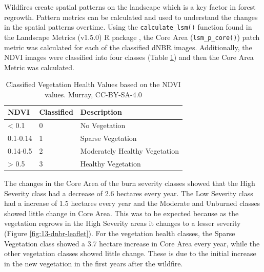 \documentclass[
]{book}
\begin{document}
Wildfires create spatial patterns on the landscape which is a key factor in forest regrowth. Pattern metrics can be calculated and used to understand the changes in the spatial patterns overtime. Using the \texttt{calculate\_lsm()} function found in the Landscape Metrics (v1.5.0) R package \citep{hesselbarth_landscapemetrics_2019}, the Core Area (\texttt{lsm\_p\_core()}) patch metric was calculated for each of the classified dNBR images. Additionally, the NDVI images were classified into four classes (Table \ref{tab:13-murray-case-study-table-2}) and then the Core Area Metric was calculated.

\begin{table}

\caption{\label{tab:13-murray-case-study-table-2}Classified Vegetation Health Values based on the NDVI values. Murray, CC-BY-SA-4.0}
\centering
\begin{tabular}[t]{l|l|l}
\hline
NDVI & Classified & Description\\
\hline
< 0.1 & 0 & No Vegetation\\
\hline
0.1-0.14 & 1 & Sparse Vegetation\\
\hline
0.14-0.5 & 2 & Moderately Healthy Vegetation\\
\hline
> 0.5 & 3 & Healthy Vegetation\\
\hline
\end{tabular}
\end{table}

The changes in the Core Area of the burn severity classes showed that the High Severity class had a decrease of 2.6 hectares every year. The Low Severity class had a increase of 1.5 hectares every year and the Moderate and Unburned classes showed little change in Core Area. This was to be expected because as the vegetation regrows in the High Severity areas it changes to a lesser severity (Figure \ref{fig:13-dnbr-leaflet}). For the vegetation health classes, the Sparse Vegetation class showed a 3.7 hectare increase in Core Area every year, while the other vegetation classes showed little change. These is due to the initial increase in the new vegetation in the first years after the wildfire.
\end{document}
